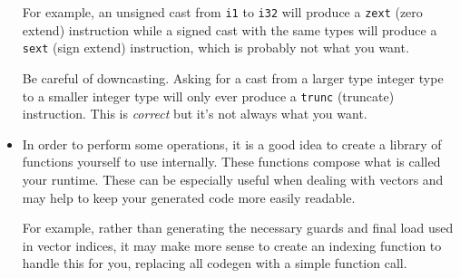 \documentclass{article}
\newcommand{\code}[1]{\texttt{\textmd{#1}}}
\begin{document}
\begin{itemize}
    For example, an unsigned cast from \code{i1} to \code{i32} will produce a \code{zext} (zero
    extend) instruction while a signed cast with the same types will produce a \code{sext} (sign
    extend) instruction, which is probably not what you want.

    Be careful of downcasting. Asking for a cast from a larger type integer type to a smaller
    integer type will only ever produce a \code{trunc} (truncate) instruction. This is
    \textit{correct} but it's not always what you want.
  \item
    In order to perform some operations, it is a good idea to create a library of functions yourself
    to use internally. These functions compose what is called your runtime. These can be especially
    useful when dealing with vectors and may help to keep your generated code more easily readable.

    For example, rather than generating the necessary guards and final load used in vector indices,
    it may make more sense to create an indexing function to handle this for you, replacing all
    codegen with a simple function call.


\end{itemize}
\end{document}
